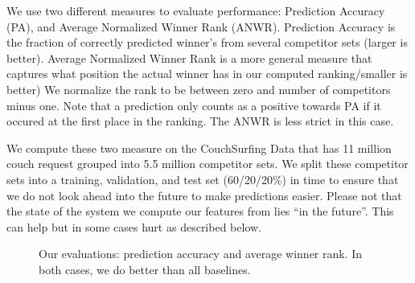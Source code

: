 We use two different measures to evaluate performance: Prediction Accuracy (PA), and Average Normalized Winner Rank (ANWR). Prediction Accuracy is the fraction of correctly predicted winner's from several competitor sets (larger is better). Average Normalized Winner Rank is a more general measure that captures what position the actual winner has in our computed ranking/smaller is better) We normalize the rank to be between zero and number of competitors minus one. Note that a prediction only counts as a positive towards PA if it occured at the first place in the ranking. The ANWR is less strict in this case. 

We compute these two measure on the CouchSurfing Data that has 11 million couch request grouped into 5.5 million competitor sets. We split these competitor sets into a training, validation, and test set (60/20/20\%) in time to ensure that we do not look ahead into the future to make predictions easier. Please not that the state of the system we compute our features from lies ``in the future''. This can help but in some cases hurt as described below.

\begin{figure}[ht]
\centering
{}
\caption{Our evaluations: prediction accuracy and average winner rank. In both cases, we do better than all baselines.}
\label{fig:eval}
\end{figure}

